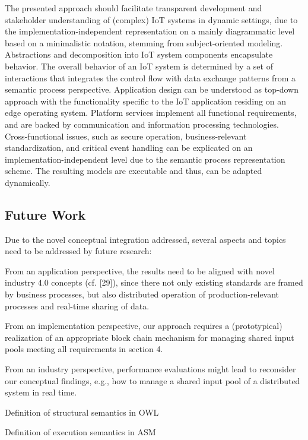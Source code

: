 The presented approach should facilitate transparent development and stakeholder understanding of (complex) IoT systems in dynamic settings, due to the implementation-independent representation on a mainly diagrammatic level based on a minimalistic notation, stemming from subject-oriented modeling. Abstractions and decomposition into IoT system components encapsulate behavior. The overall behavior of an IoT system is determined by a set of interactions that integrates the control flow with data exchange patterns from a semantic process perspective. Application design can be understood as top-down approach with the functionality specific to the IoT application residing on an edge operating system. Platform services implement all functional requirements, and are backed by communication and information processing technologies. Cross-functional issues, such as secure operation, business-relevant standardization, and critical event handling can be explicated on an implementation-independent level due to the semantic process representation scheme. The resulting models are executable and thus, can be adapted dynamically.


\subsection{Future Work}
Due to the novel conceptual integration addressed, several aspects and topics need to be addressed by future research:
\begin{list}{-}{spacing}
\item From an application perspective, the results need to be aligned with novel industry 4.0 concepts (cf. [29]), since there not only existing standards are framed by business processes, but also distributed operation of production-relevant processes and real-time sharing of data.
\item From an implementation perspective, our approach requires a (prototypical) realization of an appropriate block chain mechanism for managing shared input pools meeting all requirements in section 4.
\item From an industry perspective, performance evaluations might lead to reconsider our conceptual findings, e.g., how to manage a shared input pool of a distributed system in real time.
\item Definition of structural semantics in OWL
\item Definition of execution semantics in ASM
\end{list}

